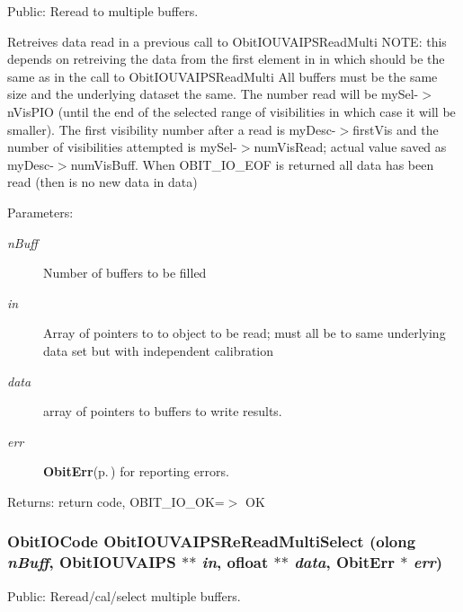 Public: Reread to multiple buffers. 

Retreives data read in a previous call to Obit\-IOUVAIPSRead\-Multi NOTE: this depends on retreiving the data from the first element in in which should be the same as in the call to Obit\-IOUVAIPSRead\-Multi All buffers must be the same size and the underlying dataset the same. The number read will be my\-Sel-$>$n\-Vis\-PIO (until the end of the selected range of visibilities in which case it will be smaller). The first visibility number after a read is my\-Desc-$>$first\-Vis and the number of visibilities attempted is my\-Sel-$>$num\-Vis\-Read; actual value saved as my\-Desc-$>$num\-Vis\-Buff. When OBIT\_\-IO\_\-EOF is returned all data has been read (then is no new data in data) \begin{Desc}
\item[Parameters:]
\begin{description}
\item[{\em n\-Buff}]Number of buffers to be filled \item[{\em in}]Array of pointers to to object to be read; must all be to same underlying data set but with independent calibration \item[{\em data}]array of pointers to buffers to write results. \item[{\em err}]{\bf Obit\-Err}{\rm (p.\,\pageref{structObitErr})} for reporting errors. \end{description}
\end{Desc}
\begin{Desc}
\item[Returns:]return code, OBIT\_\-IO\_\-OK=$>$ OK \end{Desc}
\subsubsection{\setlength{\rightskip}{0pt plus 5cm}Obit\-IOCode Obit\-IOUVAIPSRe\-Read\-Multi\-Select ({\bf olong} {\em n\-Buff}, {\bf Obit\-IOUVAIPS} $\ast$$\ast$ {\em in}, {\bf ofloat} $\ast$$\ast$ {\em data}, {\bf Obit\-Err} $\ast$ {\em err})}\label{ObitIOUVAIPS_8c_a24}


Public: Reread/cal/select multiple buffers. 


